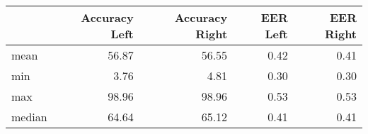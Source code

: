 \begin{tabular}{lrrrr}
\toprule
{} &  Accuracy Left &  Accuracy Right &  EER Left &  EER Right \\
\midrule
mean   &          56.87 &           56.55 &      0.42 &       0.41 \\
min    &           3.76 &            4.81 &      0.30 &       0.30 \\
max    &          98.96 &           98.96 &      0.53 &       0.53 \\
median &          64.64 &           65.12 &      0.41 &       0.41 \\
\bottomrule
\end{tabular}
